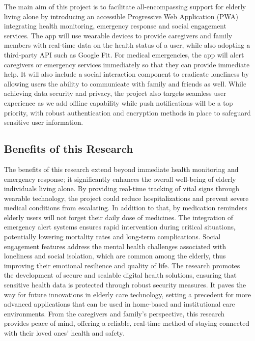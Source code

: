 \documentclass{article}
\begin{document}
The main aim of this project is to facilitate all-encompassing support for elderly living alone by introducing an accessible Progressive Web Application (PWA) integrating health monitoring, emergency response and social engagement services.
The app will use wearable devices to provide caregivers and family members with real-time data on the health status of a user, while also adopting a third-party API such as Google Fit.
For medical emergencies, the app will alert caregivers or emergency services immediately so that they can provide immediate help.
It will also include a social interaction component to eradicate loneliness by allowing users the ability to communicate with family and friends as well.
While achieving data security and privacy, the project also targets seamless user experience as we add offline capability while push notifications will be a top priority, with robust authentication and encryption methods in place to safeguard sensitive user information.

\subsection{Benefits of this Research}

The benefits of this research extend beyond immediate health monitoring and emergency response; it significantly enhances the overall well-being of elderly individuals living alone. By providing real-time tracking of vital signs through wearable technology, the project could reduce hospitalizations and prevent severe medical conditions from escalating. In addition to that, by medication reminders elderly users will not forget their daily dose of medicines.
The integration of emergency alert systems ensures rapid intervention during critical situations, potentially lowering mortality rates and long-term complications. Social engagement features address the mental health challenges associated with loneliness and social isolation, which are common among the elderly, thus improving their emotional resilience and quality of life.
The research promotes the development of secure and scalable digital health solutions, ensuring that sensitive health data is protected through robust security measures. It paves the way for future innovations in elderly care technology, setting a precedent for more advanced applications that can be used in home-based and institutional care environments. From the caregivers and family’s perspective, this research provides peace of mind, offering a reliable, real-time method of staying connected with their loved ones' health and safety.
\end{document}
